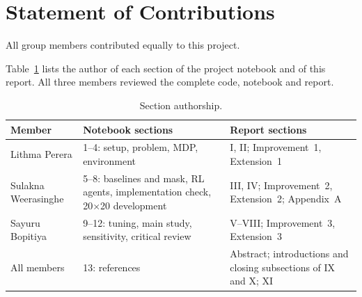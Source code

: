\section{Statement of Contributions}

All group members contributed equally to this project.

Table~\ref{tab:contrib} lists the author of each section of the project notebook and of this
report. All three members reviewed the complete code, notebook and report.

\begin{table}[H]
\centering
\caption{Section authorship.}
\label{tab:contrib}
\scriptsize
\setlength{\tabcolsep}{3pt}
\begin{tabular}{p{}p{}p{}}
\toprule
Member & Notebook sections & Report sections \\
\midrule
Lithma Perera & 1--4: setup, problem, MDP, environment & I, II; Improvement~1, Extension~1 \\
Sulakna Weerasinghe & 5--8: baselines and mask, RL agents, implementation check, 20$\times$20
development & III, IV; Improvement~2, Extension~2; Appendix~A \\
Sayuru Bopitiya & 9--12: tuning, main study, sensitivity, critical review & V--VIII;
Improvement~3, Extension~3 \\
All members & 13: references & Abstract; introductions and closing subsections of IX and X; XI \\
\bottomrule
\end{tabular}
\end{table}
